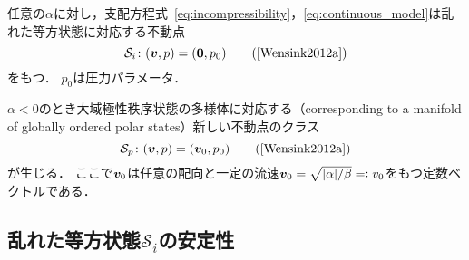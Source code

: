 \documentclass[12pt,dvipdfmx,svgnames,a4paper,uplatex]{ujarticle}
\theoremstyle{plain}
\begin{document}
任意の\(\alpha\)に対し，支配方程式~\ref{eq:incompressibility}，\ref{eq:continuous_model}は乱れた等方状態に対応する不動点
\begin{equation}
  \mathcal{S}_i \colon (\vb*{v}, p) = (\vb*{0}, p_0)
  \label{eq:disordered_isotropic_fixed_point}
  \tag{\cite[Eq. 23]{Wensink2012a}}
\end{equation}
をもつ．
\(p_0\)は圧力パラメータ．

\(\alpha < 0\)のとき大域極性秩序状態の多様体に対応する（corresponding to a manifold of globally ordered polar states）新しい不動点のクラス
\begin{equation}
  \mathcal{S}_p \colon (\vb*{v}, p) = (\vb*{v}_0, p_0)
  \label{eq:disordered_isotropic_fixed_point}
  \tag{\cite[Eq. 24]{Wensink2012a}}
\end{equation}
が生じる．
ここで\(\vb*{v}_0\)は任意の配向と一定の流速\(\vb*{v}_0 = \sqrt{\abs{\alpha}/\beta} =\vcentcolon v_0\)をもつ定数ベクトルである．


\subsection{乱れた等方状態\(\mathcal{S}_i\)の安定性}
\label{subsec:stability_of_the_disordered_isotropic_state}
\end{document}
